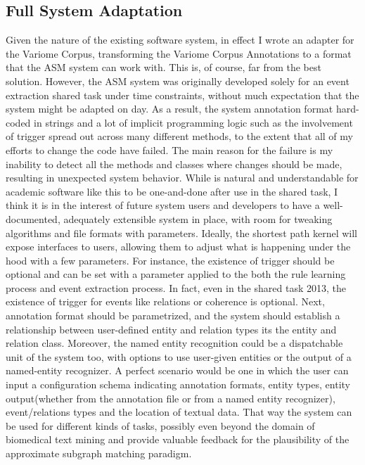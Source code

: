 \subsection{Full System Adaptation}
Given the nature of the existing software system, in effect I wrote an adapter for the Variome Corpus, transforming the Variome Corpus Annotations to a format that the ASM system can work with. This is, of course, far from the best solution. However, the ASM system was originally developed solely for an event extraction shared task under time constraints, without much expectation that the system might be adapted on day. As a result, the system annotation format hard-coded in strings and a lot of implicit programming logic such as the involvement of trigger spread out across many different methods, to the extent that all of my efforts to change the code have failed. The main reason for the failure is my inability to detect all the methods and classes where changes should be made, resulting in unexpected system behavior. While is natural and understandable for academic software like this to be one-and-done after use in the shared task, I think it is in the interest of future system users and developers to have a well-documented, adequately extensible system in place, with room for tweaking algorithms and file formats with parameters. Ideally, the shortest path kernel will expose interfaces to users, allowing them to adjust what is happening under the hood with a few parameters. For instance, the existence of trigger should be optional and can be set with a parameter applied to the both the rule learning process and event extraction process. In fact, even in the shared task 2013, the existence of trigger for events like relations or coherence is optional. Next, annotation format should be parametrized, and the system should establish a relationship between user-defined entity and relation types its the entity and relation class. Moreover, the named entity recognition could be a dispatchable unit of the system too, with options to use user-given entities or the output of a named-entity recognizer. A perfect scenario would be one in which the user can input a configuration schema indicating annotation formats, entity types, entity output(whether from the annotation file or from a named entity recognizer), event/relations types and the location of textual data. That way the system can be used for different kinds of tasks, possibly even beyond the domain of biomedical text mining and provide valuable feedback for the plausibility of the approximate subgraph matching paradigm.   
